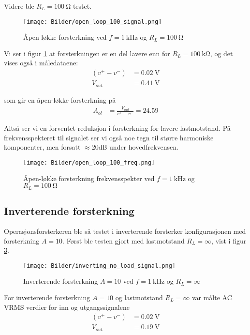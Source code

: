 Videre ble $R_L = \SI{100}{\ohm}$ testet.

\begin{figure}[H]
    \centering
    \texttt{[image: Bilder/open\_loop\_100\_signal.png]}
    \caption{Åpen-løkke forsterkning ved $f=\SI{1}{\kilo\hertz}$ og $R_L = \SI{100}{\ohm}$}
    \label{fig:open_loop_100_signal}
\end{figure}

Vi ser i figur \ref{fig:open_loop_100_signal} at forsterkningen er en del lavere enn for $R_L = \SI{100}{\kilo\ohm}$,
og det vises også i måledataene:
\begin{align*}
    (v^+ - v^-) &= \SI{0.02}{\volt} \\
    V_{out} &= \SI{0.41}{\volt}
\end{align*}

som gir en åpen-løkke forsterkning på
\begin{align*}
    A_{ol} &= \frac{V_{out}}{v^+ - v^-} = 24.59
\end{align*}

Altså ser vi en forventet reduksjon i forsterkning for lavere lastmotstand.
På frekvensspekteret til signalet ser vi også noe tegn til større harmoniske komponenter, 
men forsatt $\approx 20$dB under hovedfrekvensen.

\begin{figure}[H]
    \centering
    \texttt{[image: Bilder/open\_loop\_100\_freq.png]}
    \caption{Åpen-løkke forsterkning frekvensspekter ved $f=\SI{1}{\kilo\hertz}$ og $R_L = \SI{100}{\ohm}$}
    \label{fig:open_loop_100_freq}
\end{figure}

\subsection{Inverterende forsterkning}
Operasjonsforsterkeren ble så testet i inverterende forsterker konfigurasjonen med forsterkning $A = 10$.
Først ble testen gjort med lastmotstand $R_L = \infty$, vist i figur \ref{fig:inverting_no_load_signal}.

\begin{figure}[H]
    \centering
    \texttt{[image: Bilder/inverting\_no\_load\_signal.png]}
    \caption{Inverterende forsterkning $A = 10$ ved $f=\SI{1}{\kilo\hertz}$ og $R_L = \infty$}
    \label{fig:inverting_no_load_signal}
\end{figure}

For inverterende forsterkning $A = 10$ og lastmotstand $R_L = \infty$ var målte AC VRMS verdier for inn og utgangssignalene
\begin{align*}
    (v^+ - v^-) &= \SI{0.02}{\volt} \\
    V_{out} &= \SI{0.19}{\volt}
\end{align*}

